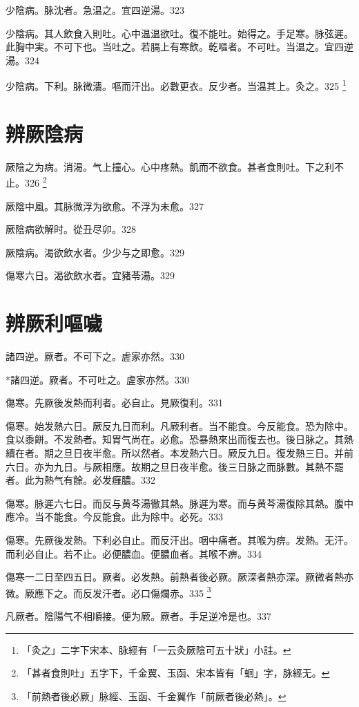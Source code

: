 少陰病。脉沈者。急温之。宜四逆湯。323

少陰病。其人飲食入則吐。心中温温欲吐。復不能吐。始得之。手足寒。脉弦遲。此胸中実。不可下也。当吐之。若膈上有寒飲。乾嘔者。不可吐。当温之。宜四逆湯。324

少陰病。下利。脉微濇。嘔而汗出。必數更衣。反少者。当温其上。灸之。325
	\footnote{「灸之」二字下宋本、脉經有「一云灸厥陰可五十狀」小註。}

\chapter{辨厥陰病}

厥陰之为病。消渴。气上撞{\khaaitp 心}。心中疼熱。飢而不欲食。{\khaaitp 甚者}食則吐。下之利不止。326
	\footnote{「甚者食則吐」五字下，千金翼、玉函、宋本皆有「蛔」字，脉經无。}

厥陰中風。其脉微浮为欲愈。不浮为未愈。327

厥陰病欲解时。從丑尽卯。328

厥陰病。渴欲飲水者。少少与之即愈。329

傷寒六日。渴欲飲水者。宜豬苓湯。{\gaoben}329

\chapter{辨厥利嘔噦}

諸四逆。厥者。不可下之。虗家亦然。330

*諸四逆。厥者。不可吐之。虗家亦然。330

傷寒。先厥後发熱而利者。必自止。見厥復利。331

傷寒。始发熱六日。厥反九日而利。凡厥利者。当不能食。今反能食。恐为除中。食以黍餅。不发熱者。知胃气尚在。必愈。恐暴熱來出而復去也。後日脉之。其熱續在者。期之旦日夜半愈。所以然者。本发熱六日。厥反九日。復发熱三日。并前六日。亦为九日。与厥相應。故期之旦日夜半愈。後三日脉之而脉數。其熱不罷者。此为熱气有餘。必发癰膿。332

傷寒。脉遲六七日。而反与黄芩湯徹其熱。脉遲为寒。而与黄芩湯復除其熱。腹中應冷。当不能食。今反能食。此为除中。必死。333

傷寒。先厥後发熱。下利必自止。而反汗出。咽中痛者。其喉为痹。发熱。无汗。而利必自止。若不止。必便膿血。便膿血者。其喉不痹。334

傷寒一二日至四五日。厥者。必发熱。前熱者後必厥。厥深者熱亦深。厥微者熱亦微。厥應下之。而反发汗者。必口傷爛赤。335
	\footnote{「前熱者後必厥」脉經、玉函、千金翼作「前厥者後必熱」。}

凡厥者。陰陽气不相順接。便为厥。厥者。手足逆冷是也。337

